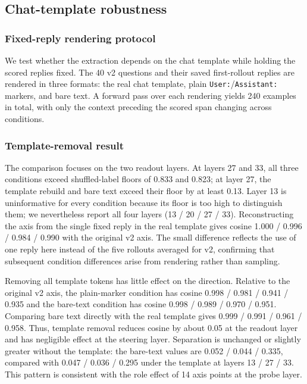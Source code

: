 \subsection{Chat-template robustness}

\subsubsection{Fixed-reply rendering protocol}

We test whether the extraction depends on the chat template while holding the
scored replies fixed. The 40 v2 questions and their saved first-rollout replies
are rendered in three formats: the real chat template, plain
\texttt{User:}/\texttt{Assistant:} markers, and bare text. A forward pass over
each rendering yields 240 examples in total, with only the context preceding
the scored span changing across conditions.

\subsubsection{Template-removal result}

The comparison focuses on the two readout layers. At layers 27 and 33,
all three conditions exceed shuffled-label floors of 0.833 and 0.823; at layer
27, the template rebuild and bare text exceed their floor by at least 0.13.
Layer 13 is uninformative for every condition because its floor is too high to
distinguish them; we nevertheless report all four layers (13 / 20 / 27 / 33).
Reconstructing the axis from the single
fixed reply in the real template gives cosine 1.000 / 0.996 / 0.984 / 0.990
with the original v2 axis. The small difference reflects the use of one reply here
instead of the five rollouts averaged for v2, confirming that subsequent
condition differences arise from rendering rather than sampling.

Removing all template tokens has little effect on the direction. Relative to
the original v2 axis, the plain-marker condition has cosine
0.998 / 0.981 / 0.941 / 0.935 and the bare-text condition has cosine
0.998 / 0.989 / 0.970 / 0.951. Comparing bare text directly with the real
template gives 0.999 / 0.991 / 0.961 / 0.958. Thus, template removal reduces
cosine by about 0.05 at the readout layer and has negligible effect at the
steering layer. Separation is unchanged or slightly greater without the
template: the bare-text values are 0.052 / 0.044 / 0.335, compared with
0.047 / 0.036 / 0.295 under the template at layers 13 / 27 / 33. This pattern
is consistent with the role effect of 14 axis points at the probe layer.

